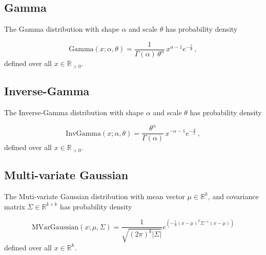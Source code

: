 \documentclass[12pt,letterpaper,onecolumn,oneside]{article}
\begin{document}
\begin{appendices}
\subsection{Gamma}

The Gamma distribution with shape $\alpha$ and scale $\theta$ has probability
density 

\[\text{Gamma}(x; \alpha, \theta) = \frac{1}{\Gamma(\alpha)\,
  \theta^\alpha} \,  x^{\alpha-1}  e^{-\frac{x}{\theta}} \, , \]
defined over all $x \in \mathbb{R}_{>0}$.

\subsection{Inverse-Gamma}

The Inverse-Gamma distribution with shape $\alpha$ and scale $\theta$
has probability density

\[\text{InvGamma}(x; \alpha, \theta) = \frac{\theta^\alpha}{\Gamma(\alpha)}
 \, x^{-\alpha-1} e^{-\frac{\theta}{x}} \, , \] defined over all $x \in
 \mathbb{R}_{>0}$.

\subsection{Multi-variate Gaussian}

The Muti-variate Gaussian distribution with mean vector
$\mu \in \mathbb{R}^k$, and
covariance matrix $\Sigma  \in \mathbb{R}^{k \times k}$ has probability density

\[\text{MVarGaussian}(x; \mu, \Sigma) = \frac{1}{\sqrt{(2 \pi)^k | \Sigma
    |}}
e^{\left( -\frac{1}{2} (x - \mu)^T \Sigma^{-1} (x - \mu) \right)}
\]
defined over all $x \in \mathbb{R}^k$.
\end{appendices}



\end{document}
